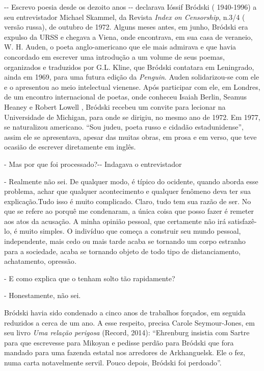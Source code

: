 -\/- Escrevo poesia desde os dezoito anos -\/- declarava Ióssif Bródski
( 1940-1996) a seu entrevistador Michael Skammel, da Revista \emph{Index
on Censorship}, n.3/4 ( versão russa), de outubro de 1972. Alguns meses
antes, em junho, Bródski era expulso da URSS e chegava a Viena, onde
encontrava, em sua casa de veraneio, W. H. Auden, o poeta
anglo-americano que ele mais admirava e que havia concordado em escrever
uma introdução a um volume de seus poemas, organizados e traduzidos por
G.L. Kline, que Bródski contatara em Leningrado, ainda em 1969, para uma
futura edição da \emph{Penguin}. Auden solidarizou-se com ele e o
apresentou ao meio intelectual vienense. Após participar com ele, em
Londres, de um encontro internacional de poetas, onde conheceu Isaiah
Berlin, Seamus Heaney e Robert Lowell , Bródski recebeu um convite para
lecionar na Universidade de Michigan, para onde se dirigiu, no mesmo ano
de 1972. Em 1977, se naturalizou americano. ``Sou judeu, poeta russo e
cidadão estadunidense'', assim ele se apresentava, apesar das muitas
obras, em prosa e em verso, que teve ocasião de escrever diretamente em
inglês.

- Mas por que foi processado?-\/- Indagava o entrevistador

- Realmente não sei. De qualquer modo, é típico do ocidente, quando
aborda esse problema, achar que qualquer acontecimento e qualquer
fenômeno deva ter sua explicação.Tudo isso é muito complicado. Claro,
tudo tem sua razão de ser. No que se refere ao porquê me condenaram, a
única coisa que posso fazer é remeter aos atos da acusação. A minha
opinião pessoal, que certamente não irá satisfazê-lo, é muito simples. O
indivíduo que começa a construir seu mundo pessoal, independente, mais
cedo ou mais tarde acaba se tornando um corpo estranho para a sociedade,
acaba se tornando objeto de todo tipo de distanciamento, achatamento,
opressão\emph{.}

- E como explica que o tenham solto tão rapidamente?

- Honestamente, não sei.

Bródski havia sido condenado a cinco anos de trabalhos forçados, em
seguida reduzidos a cerca de um ano. A esse respeito, precisa Carole
Seymour-Jones, em seu livro \emph{Uma relação perigosa} (Record, 2014):
``Ehrenburg insistia com Sartre para que escrevesse para Mikoyan e
pedisse perdão para Bródski que fora mandado para uma fazenda estatal
nos arredores de Arkhanguelsk. Ele o fez, numa carta notavelmente
servil. Pouco depois, Bródski foi perdoado''.

